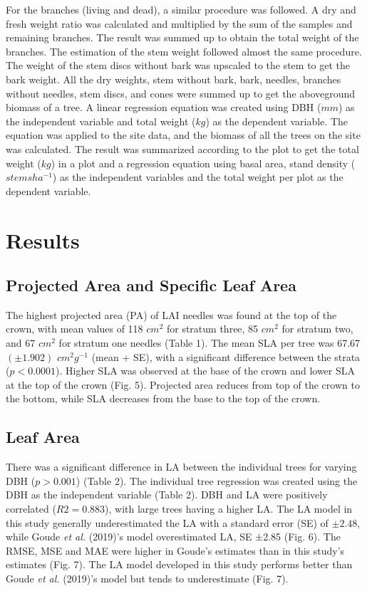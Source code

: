 \documentclass[11pt, a4paper]{report}
\begin{document}

For the branches (living and dead), a similar procedure was followed. A dry and fresh weight ratio was calculated and multiplied by the sum of the samples and remaining branches. The result was summed up to obtain the total weight of the branches. The estimation of the stem weight followed almost the same procedure. The weight of the stem discs without bark was upscaled to the stem to get the bark weight. All the dry weights, stem without bark, bark, needles, branches without needles, stem discs, and cones were summed up to get the aboveground biomass of a tree. A linear regression equation was created using DBH ($mm$) as the independent variable and total weight ($kg$) as the dependent variable. The equation was applied to the site data, and the biomass of all the trees on the site was calculated. The result was summarized according to the plot to get the total weight ($kg$) in a plot and a regression equation using basal area, stand density ($stems ha^{-1}$) as the independent variables and the total weight per plot as the dependent variable.
\chapter{Results}
\section{Projected Area and Specific Leaf Area}
The highest projected area (PA) of LAI needles was found at the top of the crown, with mean values of 118 $cm^2$ for stratum three, 85 $cm^2$ for stratum two, and 67 $cm^2$ for stratum one needles (Table 1). The mean SLA per tree was 67.67 $(±1.902)$ $cm^2g^{-1}$ (mean + SE), with a significant difference between the strata ($p<0.0001$). Higher SLA was observed at the base of the crown and lower SLA at the top of the crown (Fig. 5). Projected area reduces from top of the crown to the bottom, while SLA decreases from the base to the top of the crown.
\section{Leaf Area}
There was a significant difference in LA between the individual trees for varying DBH ($p>0.001$) (Table 2). The individual tree regression was created using the DBH as the independent variable (Table 2). DBH and LA were positively correlated ($R2 = 0.883$), with large trees having a higher LA. The LA model in this study generally underestimated the LA with a standard error (SE) of $±2.48$, while Goude \textit{et al.} (2019)’s model overestimated LA, SE ±2.85 (Fig. 6). The RMSE, MSE and MAE were higher in Goude’s estimates than in this study's estimates (Fig. 7). The LA model developed in this study performs better than Goude \textit{et al.} (2019)’s model but tends to underestimate (Fig. 7).
\end{document}
